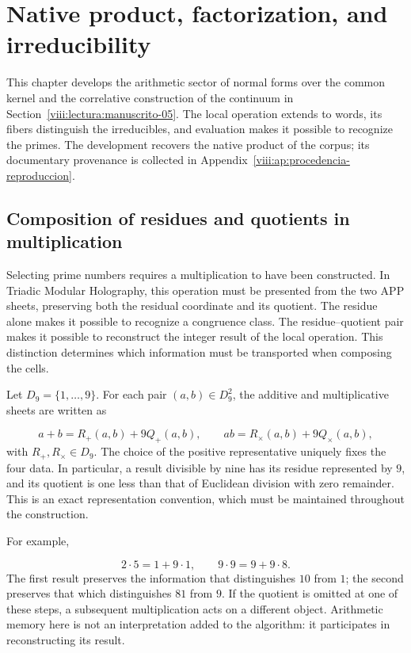 \section{Native product, factorization, and irreducibility}
\label{viii:lectura:manuscrito-01}
This chapter develops the arithmetic sector of normal forms over the common kernel and the correlative construction of the continuum in Section~\ref{viii:lectura:manuscrito-05}. The local operation extends to words, its fibers distinguish the irreducibles, and evaluation makes it possible to recognize the primes. The development recovers the native product of the corpus; its documentary provenance is collected in Appendix~\ref{viii:ap:procedencia-reproduccion}.

\subsection{Composition of residues and quotients in multiplication}
Selecting prime numbers requires a multiplication to have been constructed. In Triadic Modular Holography, this operation must be presented from the two APP sheets, preserving both the residual coordinate and its quotient. The residue alone makes it possible to recognize a congruence class. The residue–quotient pair makes it possible to reconstruct the integer result of the local operation. This distinction determines which information must be transported when composing the cells.

Let $D_9=\{1,\ldots,9\}$. For each pair $(a,b)\in D_9^2$, the additive and multiplicative sheets are written as

\[
a+b=R_+(a,b)+9Q_+(a,b),\qquad
ab=R_\times(a,b)+9Q_\times(a,b),
\]
with $R_+,R_\times\in D_9$. The choice of the positive representative uniquely fixes the four data. In particular, a result divisible by nine has its residue represented by $9$, and its quotient is one less than that of Euclidean division with zero remainder. This is an exact representation convention, which must be maintained throughout the construction.

For example,

\[
2\cdot5=1+9\cdot1,\qquad 9\cdot9=9+9\cdot8.
\]
The first result preserves the information that distinguishes $10$ from $1$; the second preserves that which distinguishes $81$ from $9$. If the quotient is omitted at one of these steps, a subsequent multiplication acts on a different object. Arithmetic memory here is not an interpretation added to the algorithm: it participates in reconstructing its result.


